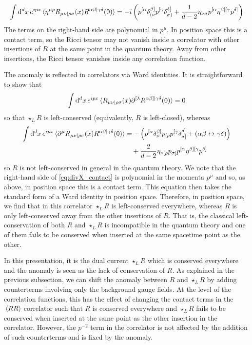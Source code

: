 \begin{equation}\label{eq:Ricci_correlator}
    \int \dd[d]{x} e^{ipx} \ev*{\eta^{\mu\rho}R_{\mu\nu|\rho\sigma}(x) R^{\alpha\beta|\gamma\delta}(0)} = -i \left( p^{[\alpha} \delta^{\beta]}_{(\nu} p^{[\gamma} \delta^{\delta]}_{\sigma)} + \frac{1}{d-2} \eta_{\nu\sigma} p^{[\alpha} \eta^{\beta][\gamma}p^{\delta]} \right)
\end{equation}
The terms on the right-hand side are polynomial in $p^\mu$. In position space this is a contact term, so the Ricci tensor may not vanish inside a correlator with other insertions of $R$ at the same point in the quantum theory. Away from other insertions, the Ricci tensor vanishes inside any correlation function.

The anomaly is reflected in correlators via Ward identities. It is straightforward to show that 
\begin{equation}
    \int\dd[d]{x} e^{ipx} \ev*{ R_{\mu\nu|\rho\sigma}(x) \partial^{[\lambda} R^{\alpha\beta]|\gamma\delta}(0)} = 0
\end{equation}
so that $\star_L R$ is left-conserved (equivalently, $R$ is left-closed), whereas
\begin{equation}
\begin{split}\label{eq:divX_contact}
    \int\dd[d]{x} e^{ipx} \ev*{ \partial^{\mu} R_{\mu\nu|\rho\sigma}(x) R^{\alpha\beta|\gamma\delta}(0)} &= -\left(p^{[\alpha} \delta^{\beta]}_\nu p_{[\rho} p^{[\gamma} \delta^{\delta]}_{\sigma]} + (\alpha\beta \leftrightarrow\gamma\delta) \right) \\
    & \quad + \frac{2}{d-2} \eta_{\nu[\rho} p_{\sigma]} p^{[\alpha} \eta^{\beta][\gamma} p^{\delta]} 
\end{split}
\end{equation}
so $R$ is not left-conserved in general in the quantum theory. We note that the right-hand side of \eqref{eq:divX_contact} is polynomial in the momenta $p^\mu$ and so, as above, in position space this is a contact term. This equation then takes the standard form of a Ward identity in position space. Therefore, in position space, we find that in this correlator $\star_L R$ is left-conserved everywhere, whereas $R$ is only left-conserved away from the other insertions of $R$. That is, the classical left-conservation of both $R$ and $\star_L R$ is incompatible in the quantum theory and one of them fails to be conserved when inserted at the same spacetime point as the other.

In this presentation, it is the dual current $\star_L R$ which is conserved everywhere and the anomaly is seen as the lack of conservation of $R$. As explained in the previous subsection, we can shift the anomaly between $R$ and $\star_L R$ by adding counterterms involving only the background gauge fields. At the level of the correlation functions, this has the effect of changing the contact terms in the $\ev*{RR}$ correlator such that $R$ is conserved everywhere and $\star_L R$ fails to be conserved when inserted at the same point as the other insertion in the correlator. However, the $p^{-2}$ term in the correlator is not affected by the addition of such counterterms and is fixed by the anomaly.

